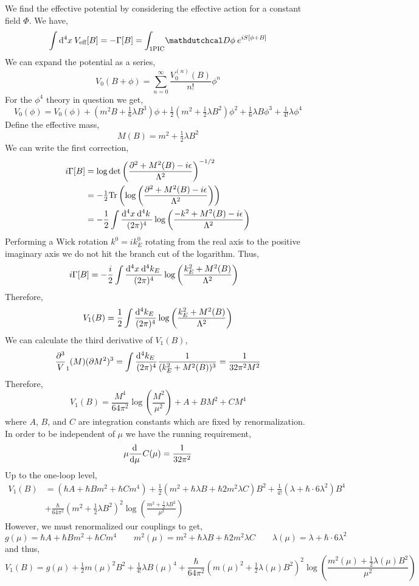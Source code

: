 \documentclass[12pt]{extarticle}
\begin{document}
We find the effective potential by considering the effective action for a constant field $\Phi$. We have,
\[ \int \dn{4}{x} V_{\text{eff}}[B] = -\Gamma[B] = \int_{\text{1PIC}} \pathd{\phi} e^{i S[\phi + B]} \]
We can expand the potential as a series,
\[ V_0(B + \phi) = \sum_{n = 0}^\infty \frac{V_0^{(n)}(B)}{n!} \phi^n \]
For the $\phi^4$ theory in question we get,
\[ V_0(\phi) = V_0(\phi) + (m^2 B + \tfrac{1}{6} \lambda B^3) \phi + \tfrac{1}{2} (m^2 + \tfrac{1}{2} \lambda B^2) \phi^2 + \tfrac{1}{6} \lambda B \phi^3 + \tfrac{1}{4!} \lambda \phi^4 \]
Define the effective mass,
\[ M(B) = m^2 + \tfrac{1}{2} \lambda B^2 \]
We can write the first correction,
\begin{align*}
i\Gamma[B] & = \log{\det{\left( \frac{\partial^2 + M^2(B) - i \epsilon}{\Lambda^2} \right)^{-1/2}}}
\\
& = -\tfrac{1}{2} \mathrm{Tr}\left( \log{\left( \frac{\partial^2 + M^2(B) - i \epsilon}{\Lambda^2} \right)} \right) 
\\
& = - \frac{1}{2} \int \frac{\mathrm{d}^{4} x \: \mathrm{d}^{4} k \:}{(2 \pi)^4} \log{\left( \frac{-k^2 + M^2(B) - i \epsilon}{\Lambda^2} \right)} 
\end{align*}
Performing a Wick rotation $k^0 = i k^0_E$ rotating from the real axis to the positive imaginary axis we do not hit the branch cut of the logarithm. Thus,
\begin{align*}
i\Gamma[B] & = - \frac{i}{2} \int \frac{\mathrm{d}^{4} x \: \mathrm{d}^{4} k_E \:}{(2 \pi)^4} \log{\left( \frac{k_E^2 + M^2(B)}{\Lambda^2} \right)} 
\end{align*}
Therefore,
\[ V_1(B) = \frac{1}{2} \int \frac{\mathrm{d}^{4} k_E \:}{(2 \pi)^4} \log{\left( \frac{k_E^2 + M^2(B)}{\Lambda^2} \right)} \]
We can calculate the third derivative of $V_1(B)$,
\[ \frac{\partial^3} V_1(M){(\partial M^2)^3} = \int \frac{\mathrm{d}^{4} k_E \:}{(2 \pi)^4} \frac{1}{(k_E^2 + M^2(B))^3} = \frac{1}{32 \pi^2 M^2} \]
Therefore,
\[ V_1(B) = \frac{M^4}{64 \pi^2} \log{\left( \frac{M^2}{\mu^2} \right)} + A + B M^2 + C M^4 \]
where $A$, $B$, and $C$ are integration constants which are fixed by renormalization. In order to be independent of $\mu$ we have the running requirement,
\[ \mu \frac{\mathrm{d} \:}{\mathrm{d}\mu \:} C(\mu) = \frac{1}{32 \pi^2} \]
Up to the one-loop level,
\begin{align*}
V_1(B) &= \left( \hbar A + \hbar B m^2 + \hbar C m^4 \right) + \tfrac{1}{2} \left( m^2 + \hbar \lambda B + \hbar 2 m^2 \lambda C \right) B^2 + \tfrac{1}{4!} \left( \lambda + \hbar \cdot 6 \lambda^2 \right) B^4 
\\
\quad & + \frac{\hbar}{64 \pi^2} \left(m^2 + \tfrac{1}{2} \lambda B^2 \right)^2 \log{\left( \frac{m^2 + \tfrac{1}{2} \lambda B^2}{\mu^2} \right)} 
\end{align*}
However, we must renormalized our couplings to get,
\[ g(\mu) = \hbar A + \hbar B m^2 + \hbar C m^4  \quad \quad m^2(\mu) = m^2 + \hbar \lambda B + \hbar 2 m^2 \lambda C \quad \quad \lambda(\mu) = \lambda + \hbar \cdot 6 \lambda^2 \]
and thus,
\[ V_1(B) = g(\mu) + \tfrac{1}{2} m(\mu)^2 B^2 + \tfrac{1}{4!} \lambda B(\mu)^4 + \frac{\hbar}{64\pi^2} \left(m(\mu)^2 + \tfrac{1}{2} \lambda(\mu) B^2 \right)^2 \log{\left( \frac{m^2(\mu) + \tfrac{1}{2} \lambda(\mu) B^2}{\mu^2} \right)}  \] 
\end{document}
